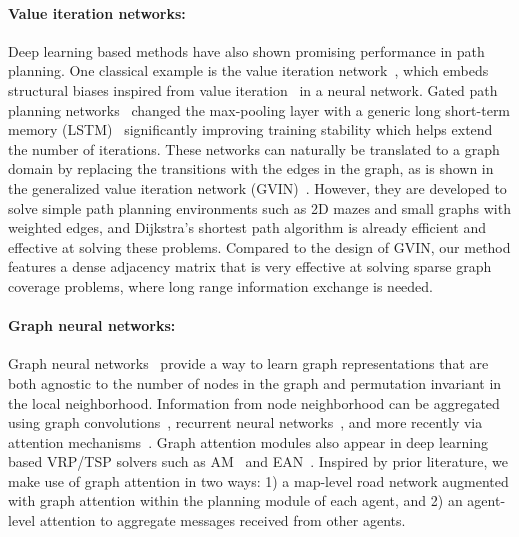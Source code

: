 \paragraph{Value iteration networks:}
Deep learning based methods have also shown promising performance in path planning. One classical
example is the value iteration network~\citep{vin}, which embeds structural biases inspired from
value iteration~\citep{bellman} in a neural network. Gated path planning networks~\citep{gppn}
changed the max-pooling layer with a generic long short-term memory (LSTM)~\citep{lstm}
significantly improving training stability which helps extend the number of iterations. These
networks can naturally be translated to a graph domain by replacing the transitions with the edges
in the graph, as is shown in the generalized value iteration network (GVIN)~\citep{gvin}. However,
they are developed to solve simple path planning environments such as 2D mazes and small graphs with
weighted edges, and Dijkstra's shortest path algorithm is already efficient and effective at solving these
 problems. %
Compared to the design of GVIN, our method features a dense adjacency matrix that is very
effective at solving sparse graph coverage problems, where long range information exchange is
needed.

\paragraph{Graph neural networks:}
Graph neural networks~\cite{gnn,gnnsurvey} provide a way to learn graph representations that are
both agnostic to the number of nodes in the graph and permutation invariant in the local
neighborhood. Information from node neighborhood can be aggregated using graph
convolutions~\citep{gcn}, recurrent neural networks~\cite{ggnn}, and more recently via attention
mechanisms~\cite{gtn,gat}. Graph attention modules also appear in deep learning based VRP/TSP solvers such
as AM~\cite{am} and EAN~\cite{ean}. %
Inspired by prior literature, we make use of graph attention in two ways: 1) a
map-level road network augmented with graph attention within the planning module of each agent, and 2) an agent-level attention
to aggregate messages received from other agents.

